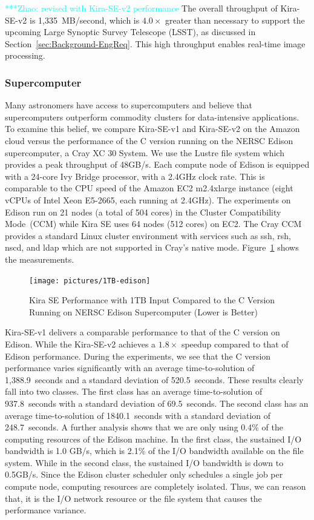 \documentclass[10pt,journal,compsoc]{IEEEtran}
\newcommand{\zhaonote}[1]{{\textcolor{cyan}    { ***Zhao:      #1 }}}
\newcommand{\zhaonote}[1]{}
\begin{document}
\zhaonote{revised with Kira-SE-v2 performance}
The overall throughput of Kira-SE-v2 is 1,335~MB/second, which is $4.0\times$ greater than necessary
to support the upcoming Large Synoptic Survey Telescope (LSST), as discussed in
Section~\ref{sec:Background-EngReq}. This high throughput enables real-time image processing.

\subsubsection{Supercomputer}

Many astronomers have access to supercomputers and believe that
supercomputers outperform commodity clusters for data-intensive applications.
To examine this belief, we compare Kira-SE-v1 and Kira-SE-v2 on the Amazon cloud versus the performance of
the C version running on the NERSC Edison supercomputer, a Cray XC 30 System. We use
the Lustre file system which provides a peak throughput of 48GB/s. Each compute
node of Edison is equipped with a 24-core Ivy Bridge processor, with a 2.4GHz clock rate.
This is comparable to the CPU speed of the Amazon EC2 m2.4xlarge instance (eight vCPUs of
Intel Xeon E5-2665, each running at 2.4GHz). The experiments on Edison run on 21
nodes (a total of 504 cores) in the Cluster Compatibility Mode~(CCM)
while Kira SE uses 64 nodes (512 cores) on EC2. The Cray CCM provides a 
standard Linux cluster environment with services such as ssh, rsh, nscd, and ldap which 
are not supported in Cray's native mode.
Figure~\ref{fig:1tb-edison} shows the measurements.

\begin{figure}[h]
	\begin{center}
		\texttt{[image: pictures/1TB-edison]}
		\caption{Kira SE Performance with 1TB Input Compared to the C Version Running on NERSC Edison Supercomputer (Lower is Better)
		\label{fig:1tb-edison}}
  	\end{center}
\end{figure}

Kira-SE-v1 delivers a comparable performance to that of the C version on Edison. 
While the Kira-SE-v2 achieves a $1.8\times$ speedup compared to that of Edison performance.
During the experiments, we see that the C version performance varies significantly with an 
average time-to-solution of 1,388.9~seconds and a standard deviation of 520.5~seconds. 
These results clearly fall into two classes. The first class has an average time-to-solution of 937.8~seconds
with a standard deviation of 69.5~seconds. The second class has an average time-to-solution 
of 1840.1~seconds with a standard deviation of 248.7~seconds. A further analysis shows that we are only 
using 0.4\% of the computing resources of the Edison machine. In the first class, the sustained
I/O bandwidth is 1.0 GB/s, which is 2.1\% of the I/O bandwidth available on the file system.
While in the second class, the sustained I/O bandwidth is down to 0.5GB/s.
Since the Edison cluster scheduler only schedules a single job per compute node, computing resources 
are completely isolated. Thus, we can reason that, it is the I/O network resource or the file system 
that causes the performance variance. 
\end{document}
